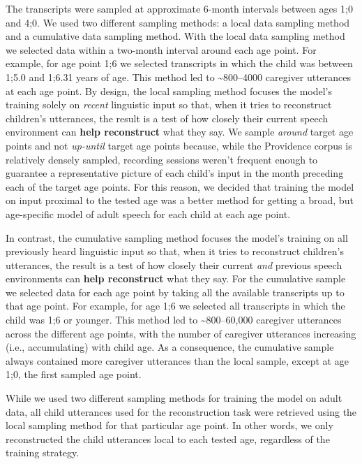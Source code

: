 \documentclass[
  english,
  man,mask,floatsintext]{apa6}
\begin{document}
The transcripts were sampled at approximate 6-month intervals between ages 1;0 and 4;0. We used two different sampling methods: a local data sampling method and a cumulative data sampling method. With the local data sampling method we selected data within a two-month interval around each age point. For example, for age point 1;6 we selected transcripts in which the child was between 1;5.0 and 1;6.31 years of age. This method led to \textasciitilde800--4000 caregiver utterances at each age point. By design, the local sampling method focuses the model's training solely on \emph{recent} linguistic input so that, when it tries to reconstruct children's utterances, the result is a test of how closely their current speech environment can \textbf{help reconstruct} what they say. We sample \emph{around} target age points and not \emph{up-until} target age points because, while the Providence corpus is relatively densely sampled, recording sessions weren't frequent enough to guarantee a representative picture of each child's input in the month preceding each of the target age points. For this reason, we decided that training the model on input proximal to the tested age was a better method for getting a broad, but age-specific model of adult speech for each child at each age point.

In contrast, the cumulative sampling method focuses the model's training on all previously heard linguistic input so that, when it tries to reconstruct children's utterances, the result is a test of how closely their current \emph{and} previous speech environments can \textbf{help reconstruct} what they say. For the cumulative sample we selected data for each age point by taking all the available transcripts up to that age point. For example, for age 1;6 we selected all transcripts in which the child was 1;6 or younger. This method led to \textasciitilde800--60,000 caregiver utterances across the different age points, with the number of caregiver utterances increasing (i.e., accumulating) with child age. As a consequence, the cumulative sample always contained more caregiver utterances than the local sample, except at age 1;0, the first sampled age point.

While we used two different sampling methods for training the model on adult data, all child utterances used for the reconstruction task were retrieved using the local sampling method for that particular age point. In other words, we only reconstructed the child utterances local to each tested age, regardless of the training strategy.
\end{document}

